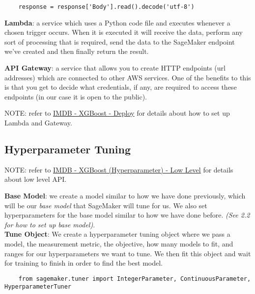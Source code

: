 \documentclass[11pt, a4paper]{article}
\begin{document}
\begin{spacing}{1.1}
\begin{lstlisting}
	response = response['Body'].read().decode('utf-8')                                  
	\end{lstlisting} \vspace*{2mm}
	\textbf{Lambda}: a service which uses a Python code file and executes whenever a chosen trigger occurs. When it is executed it will receive the data, perform any sort of processing that is required, send the data to the SageMaker endpoint we've created and then finally return the result. \newpage

	\noindent \textbf{API Gateway}: a service that allows you to create HTTP endpoints (url addresses) which are connected to other AWS services. One of the benefits to this is that you get to decide what credentials, if any, are required to access these endpoints (in our case it is open to the public).
	\begin{center}
		\color{darkgray} NOTE: refer to \href{file:///E:/Documents/UdacityNotes/ML\%20Engineer/sample\_code/IMDB\%20-\%20XGBoost\%20-\%20Deploy.html}{IMDB - XGBoost - Deploy} for details about how to set up Lambda and Gateway. \color{black}
	\end{center} \vspace*{1mm}

	\subsection{Hyperparameter Tuning}
	\begin{center}
	\color{darkgray} NOTE: refer to \href{file:///E:/Documents/UdacityNotes/ML\%20Engineer/sample\_code/BH\%20-\%20XGBoost\%20(Hyperparameter)\%20-\%20Low\%20Level.html}{IMDB - XGBoost (Hyperparameter) - Low Level} for details about low level API. \color{black}
	\end{center} \vspace*{1mm}
	\textbf{Base Model}: we create a model similar to how we have done previously, which will be our \textit{base model} that SageMaker will tune for us. We also set hyperparameters for the base model similar to how we have done before. \textit{(See 2.2 for how to set up base model)}. \vspace*{2mm}\\
	\textbf{Tune Object}: We create a hyperparameter tuning object where we pass a model, the measurement metric, the objective, how many models to fit, and ranges for our hyperparameters we want to tune. We then fit this object and wait for training to finish in order to find the best model. 
	\begin{lstlisting}
	from sagemaker.tuner import IntegerParameter, ContinuousParameter, HyperparameterTuner
	

\end{lstlisting}
\end{spacing}
\end{document}
